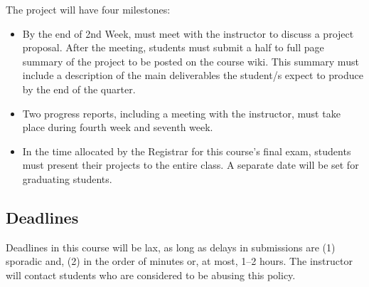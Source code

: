 \documentclass[11pt]{article}
\begin{document}
The project will have four milestones:

\begin{itemize}
 \item By the end of 2nd Week, must meet with the instructor to discuss a project proposal. After the meeting, students must submit a half to full page summary of the project to be posted on the course wiki. This summary must include a description of the main deliverables the student/s expect to produce by the end of the quarter.
 \item Two progress reports, including a meeting with the instructor, must take place during fourth week and seventh week.
 \item In the time allocated by the Registrar for this course's final exam, students must present their projects to the entire class. A separate date will be set for graduating students.
\end{itemize}

\subsection{Deadlines}

Deadlines in this course will be lax, as long as delays in submissions are (1) sporadic and, (2) in the order of minutes or, at most, 1--2 hours. The instructor will contact students who are considered to be abusing this policy.
\end{document}
